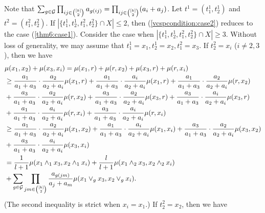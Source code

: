 \documentclass[11pt]{article}
\theoremstyle{definition}
\begin{document}
Note that $\sum_{g\in \mathcal{G}}\prod_{\tiny ij\in
\begin{pmatrix}
[k] \\
2 \\
\end{pmatrix}\normalsize}a_{g(ij)}=\prod_{\tiny ij\in
\begin{pmatrix}
[k] \\
2 \\
\end{pmatrix}\normalsize}(a_i+a_j)$. Let $t^1=(t_1^1,t_2^1)$ and $t^2=(t_1^2,t_2^2)$. If $|\{t_1^1,t_2^1,t_1^2,t_2^2\}\cap X|\leq 2$, then (\ref{vcspcondition:case2}) reduces to the case (\ref{thm6:case1}). Consider the case when $|\{t_1^1,t_2^1,t_1^2,t_2^2\}\cap X|\geq 3$. Without loss of generality, we may assume that $t_1^1=x_1,t_2^1=x_2,t_1^2=x_3$. If $t_2^2=x_i$ ($i\neq 2,3$), then we have
\begin{align}
    &\mu(x_1,x_2)+\mu(x_3,x_i)=\mu(x_1,r)+\mu(r,x_2)+\mu(x_3,r)+\mu(r,x_i)\notag\\
    &\geq \frac{a_1}{a_1+a_3}\cdot \frac{a_2}{a_2+a_i}\mu(x_1,r)+\frac{a_1}{a_1+a_3}\cdot \frac{a_i}{a_2+a_i}\mu(x_1,r)+\frac{a_1}{a_1+a_3}\cdot \frac{a_2}{a_2+a_i}\mu(r,x_2)\notag\\
    &+\frac{a_3}{a_1+a_3}\cdot \frac{a_2}{a_2+a_i}\mu(r,x_2)+\frac{a_3}{a_1+a_3}\cdot \frac{a_2}{a_2+a_i}\mu(x_3,r)+\frac{a_3}{a_1+a_3}\cdot \frac{a_i}{a_2+a_i}\mu(x_3,r)\notag\\
    &+\frac{a_1}{a_1+a_3}\cdot \frac{a_i}{a_2+a_i}\mu(r,x_i)+\frac{a_3}{a_1+a_3}\cdot \frac{a_i}{a_2+a_i}\mu(r,x_i)\notag\\
    &\geq \frac{a_1}{a_1+a_3}\cdot \frac{a_2}{a_2+a_i}\mu(x_1,x_2)+\frac{a_1}{a_1+a_3}\cdot \frac{a_i}{a_2+a_i}\mu(x_1,x_i)+\frac{a_3}{a_1+a_3}\cdot \frac{a_2}{a_2+a_i}\mu(x_3,x_2)\notag\\
    &+\frac{a_3}{a_1+a_3}\cdot \frac{a_i}{a_2+a_i}\mu(x_3,x_i)\notag\\
    &= \frac{1}{l+1}\mu(x_1\wedge_1 x_3,x_2\wedge_1 x_i)+\frac{l}{l+1}\mu(x_1\wedge_2 x_3,x_2\wedge_2 x_i)\notag\\
    &+\sum_{g\in \mathcal{G}}\prod_{\tiny jm\in
\begin{pmatrix}
[k] \\
2 \\
\end{pmatrix}\normalsize}\frac{a_{g(jm)}}{a_j+a_m}\mu(x_1\vee_g x_3,x_2\vee_g x_i).
\end{align}
(The second inequality is strict when $x_i=x_1$.)
If $t_2^2=x_2$, then we have
\end{document}
